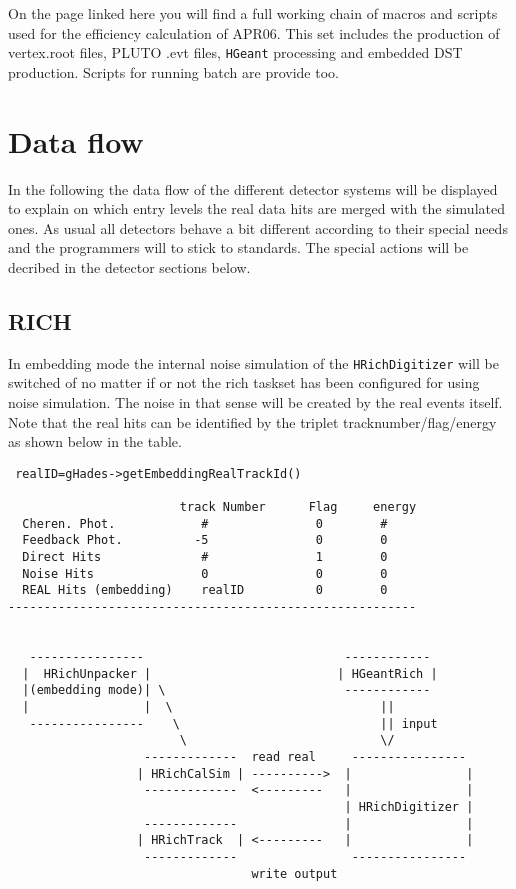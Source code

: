 On the page linked here you will find a full working chain of macros 
and scripts used for the efficiency calculation of APR06. This set 
includes the production of vertex.root files, PLUTO .evt files, \verb+HGeant+ 
processing and embedded DST production. Scripts for running batch 
are provide too. 

\section{Data flow}

In the following the data flow of the different detector systems will be displayed 
to explain on which entry levels the real data hits are merged with the simulated 
ones. As usual all detectors behave a bit different according to their special 
needs and the programmers will to stick to standards. The special actions will 
be decribed in the detector sections below.

\subsection{RICH}

In embedding mode the internal noise simulation of the \verb+HRichDigitizer+ will be 
switched of no matter if or not the rich taskset has been configured for using 
noise simulation. The noise in that sense will be created by the real events 
itself. Note that the real hits can be identified by the triplet 
tracknumber/flag/energy as shown below in the table. 

\begin{lstlisting}
 realID=gHades->getEmbeddingRealTrackId()

                        track Number      Flag     energy
  Cheren. Phot.            #               0        #
  Feedback Phot.          -5               0        0
  Direct Hits              #               1        0
  Noise Hits               0               0        0  
  REAL Hits (embedding)    realID          0        0
---------------------------------------------------------


   ----------------                            ------------
  |  HRichUnpacker |                          | HGeantRich |
  |(embedding mode)| \                         ------------
  |                |  \                             ||
   ----------------    \                            || input 
                        \                           \/
                   -------------  read real     ----------------
                  | HRichCalSim | ---------->  |                |
                   -------------  <---------   |                |
                                               | HRichDigitizer |
                   -------------               |                |
                  | HRichTrack  | <---------   |                |
                   -------------                ----------------
                                  write output
\end{lstlisting}

